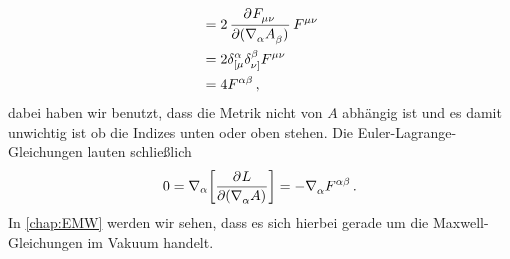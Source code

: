 \begin{beispiel}
\begin{equation}
\begin{split}
&=2\dpd{\tensor{F}{_\mu_\nu}}{(\tensor{\nabla}{_\alpha}\tensor{A}{_\beta})}\tensor{F}{^\mu^\nu}\\
&=2\tensor*{\delta}{^\alpha_[_\mu}\tensor*{\delta}{^\beta_\nu_]}\tensor{F}{^\mu^\nu}\\
&=4\tensor{F}{^\alpha^\beta}\,,
\end{split}
\end{equation}
dabei haben wir benutzt, dass die Metrik nicht von $A$ abhängig ist und es damit
unwichtig ist ob die Indizes unten oder oben stehen.
Die Euler-Lagrange-Gleichungen lauten schließlich
\begin{equation}
0=\nabla_\alpha\left[\dpd{L}{\left(\tensor{\nabla}{_\alpha}A\right)}\right]
=-\tensor{\nabla}{_\alpha}\tensor{F}{^\alpha^\beta}\,.
\end{equation}
In \autoref{chap:EMW} werden wir sehen, dass es sich hierbei gerade um die
Maxwell-Gleichungen im Vakuum handelt.
\end{beispiel}
